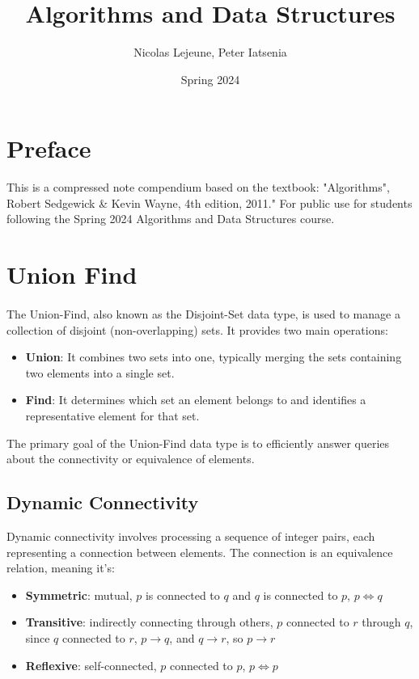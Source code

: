 \documentclass{article}
\title{Algorithms and Data Structures}
\author{Nicolas Lejeune, Peter Iatsenia }
\date{Spring 2024}
\begin{document}
\maketitle

\tableofcontents

\pagebreak

\section*{Preface}
This is a compressed note compendium based on the textbook: "Algorithms", Robert Sedgewick \& Kevin Wayne, 4th edition, 2011." For public use for students following the Spring 2024 Algorithms and Data Structures course.

\section{Union Find}
\paragraph{}
The Union-Find, also known as the Disjoint-Set data type, is used to manage a collection of disjoint (non-overlapping) sets. It provides two main operations:

\begin{itemize}
    \item \textbf{Union}: It combines two sets into one, typically merging the sets containing two elements into a single set.
    \item \textbf{Find}: It determines which set an element belongs to and identifies a representative element for that set.
\end{itemize}

The primary goal of the Union-Find data type is to efficiently answer queries about the connectivity or equivalence of elements. 

\subsection{Dynamic Connectivity}
Dynamic connectivity involves processing a sequence of integer pairs, each representing a connection between elements. The connection is an equivalence relation, meaning it's: 

\begin{itemize}
    \item \textbf{Symmetric}: mutual, $p$ is connected to $q$ and $q$ is connected to $p$, \hfill \break 
    $p \iff q$
    \item \textbf{Transitive}: indirectly connecting through others, $p$ connected to $r$ through $q$, since $q$ connected to $r$, \hfill \break 
    $p \to q$, and $q \to r$, so $p \to r$
    \item \textbf{Reflexive}: self-connected, $p$ connected to $p$, \hfill \break 
    $p \iff p$
\end{itemize}
\end{document}
